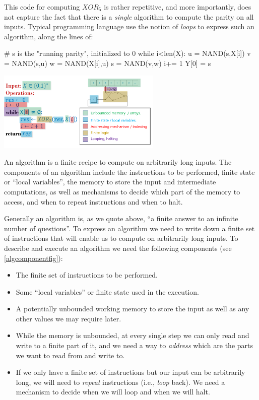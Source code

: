 This code for computing \(\ensuremath{\mathit{XOR}}_5\) is rather
repetitive, and more importantly, does not capture the fact that there
is a \emph{single} algorithm to compute the parity on all inputs.
Typical programming language use the notion of \emph{loops} to express
such an algorithm, along the lines of:

\begin{code}
# s is the "running parity", initialized to 0
while i<len(X):
    u = NAND(s,X[i])
    v = NAND(s,u)
    w = NAND(X[i],u)
    s = NAND(v,w)
    i+= 1
Y[0] = s
\end{code}


\begin{marginfigure}
\centering
\includegraphics[width=\linewidth, height=1.5in, keepaspectratio]{../figure/algcomponents.png}
\caption{An algorithm is a finite recipe to compute on arbitrarily long
inputs. The components of an algorithm include the instructions to be
performed, finite state or ``local variables'', the memory to store the
input and intermediate computations, as well as mechanisms to decide
which part of the memory to access, and when to repeat instructions and
when to halt.}
\label{algcomponentfig}
\end{marginfigure}

Generally an algorithm is, as we quote above, ``a finite answer to an
infinite number of questions''. To express an algorithm we need to write
down a finite set of instructions that will enable us to compute on
arbitrarily long inputs. To describe and execute an algorithm we need
the following components (see \cref{algcomponentfig}):

\begin{itemize}
\item
  The finite set of instructions to be performed.
\item
  Some ``local variables'' or finite state used in the execution.
\item
  A potentially unbounded working memory to store the input as well as
  any other values we may require later.
\item
  While the memory is unbounded, at every single step we can only read
  and write to a finite part of it, and we need a way to \emph{address}
  which are the parts we want to read from and write to.
\item
  If we only have a finite set of instructions but our input can be
  arbitrarily long, we will need to \emph{repeat} instructions (i.e.,
  \emph{loop} back). We need a mechanism to decide when we will loop and
  when we will halt.
\end{itemize}

